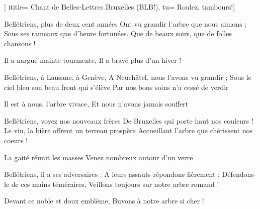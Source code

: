  [
ititle= {Chant de Belles-Lettres Bruxelles (BLB!)},
tu= {Roulez, tambours!}]


\beginverse
Bellétriens, plus de deux cent années
Ont vu grandir l'arbre que nous aimons ; 
Sous ses rameaux que d'heure fortunées. 
Que de beaux soirs, que de folles chansons !

Il a nargué mainte tourmente,
Il a bravé plus d'un hiver !
 {}
\endverse

\beginverse
Bellétriens, à Lausane, à Genève,
A Neuchâtel, nous l'avons vu grandir ; 
Sous le ciel bleu son beau front qui s'élève 
Par nos bons soins n'a cessé de verdir

Il est à nous, l'arbre vivace,
Et nous n'avons jamais souffert
 {}
\endverse

\beginverse
Bellétriens, voyez nos nouveaux frères
De Bruxelles qui porte haut nos couleurs !
Le vin, la bière offrent un terreau prospère 
Accueillant l'arbre que chérissent nos coeurs !

La gaité réunit les masses
Venez nombreux autour d'un verre
 {}
\endverse

\beginverse
Bellétriens, il a ses adversaires :
A leurs assauts répondons fièrement ; 
Défendons-le de ces mains téméraires, 
Veillons toujours sur notre arbre romand !

Devant ce noble et doux emblème,
Buvons à notre arbre si cher !
 {}
\endverse

\endsong